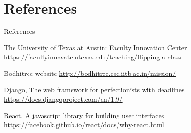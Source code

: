 \documentclass[xcolor=table]{beamer}
\begin{document}
\section*{References}

\begin{frame}[allowframebreaks]{References}
    
  \begin{thebibliography}{10}

  \large The University of Texas at Austin:
  \small Faculty Innovation Center
  \newblock  \small \url{https://facultyinnovate.utexas.edu/teaching/flipping-a-class}
  
  \large Bodhitree website
  \newblock  \small \url{http://bodhitree.cse.iitb.ac.in/mission/}
  
  \large Django, The web framework for perfectionists with deadlines
  \newblock  \small \url{https://docs.djangoproject.com/en/1.9/}
  
  \large React, A javascript library for building user interfaces
  \newblock  \small \url{https://facebook.github.io/react/docs/why-react.html}
 
  \end{thebibliography}
\end{frame}
\end{document}
